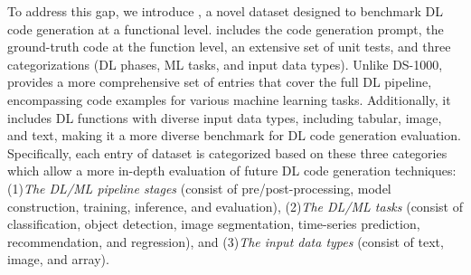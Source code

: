 To address this gap, we introduce \tool, a novel dataset designed to benchmark DL code generation at a functional level. \tool includes the code generation prompt, the ground-truth code at the function level, an extensive set of unit tests, and three categorizations (DL phases, ML tasks, and input data types). Unlike DS-1000, \tool provides a more comprehensive set of entries that cover the full DL pipeline, encompassing code examples for various machine learning tasks. Additionally, it includes DL functions with diverse input data types, including tabular, image, and text, making it a more diverse benchmark for DL code generation evaluation.
Specifically, each entry of \tool dataset is categorized based on these three categories which allow a more in-depth evaluation of future DL code generation techniques:
(1)\textit{The DL/ML pipeline stages} (consist of pre/post-processing, model construction, training, inference, and evaluation), (2)\textit{The DL/ML tasks} (consist of classification, object detection, image segmentation, time-series prediction, recommendation, and regression), and (3)\textit{The input data types} (consist of text, image, and array).

 
